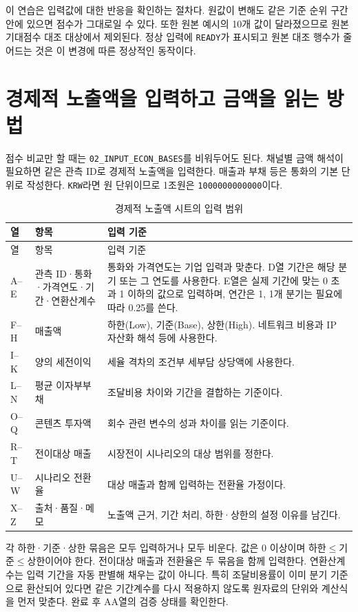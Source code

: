 이 연습은 입력값에 대한 반응을 확인하는 절차다. 원값이 변해도 같은 기준 순위 구간 안에 있으면 점수가 그대로일 수 있다. 또한 원본 예시의 10개 값이 달라졌으므로 원본 기대점수 대조 대상에서 제외된다. 정상 입력에 \texttt{READY}가 표시되고 원본 대조 행수가 줄어드는 것은 이 변경에 따른 정상적인 동작이다.

\section{경제적 노출액을 입력하고 금액을 읽는 방법}

점수 비교만 할 때는 \nolinkurl{02_INPUT_ECON_BASES}를 비워두어도 된다. 채널별 금액 해석이 필요하면 같은 관측 ID로 경제적 노출액을 입력한다. 매출과 부채 등은 통화의 기본 단위로 작성한다. \texttt{KRW}라면 원 단위이므로 1조원은 \texttt{1000000000000}이다.

\begin{longtable}{@{}L{2.3cm}L{4.0cm}L{8.4cm}@{}}
\caption{경제적 노출액 시트의 입력 범위}\label{tab:simulator-economic-input}\\
\toprule
{}
열 & 항목 & 입력 기준 \\
\midrule
\endfirsthead
\toprule
{}
열 & 항목 & 입력 기준 \\
\midrule
\endhead
\bottomrule
\endfoot
A--E & 관측 ID·통화·가격연도·기간·연환산계수 & 통화와 가격연도는 기업 입력과 맞춘다. D열 기간은 해당 분기 또는 그 연도를 사용한다. E열은 실제 기간에 맞는 0 초과 1 이하의 값으로 입력하며, 연간은 1, 1개 분기는 필요에 따라 0.25를 쓴다. \\
F--H & 매출액 & 하한(Low), 기준(Base), 상한(High). 네트워크 비용과 IP 자산화 해석 등에 사용한다. \\
I--K & 양의 세전이익 & 세율 격차의 조건부 세부담 상당액에 사용한다. \\
L--N & 평균 이자부부채 & 조달비용 차이와 기간을 결합하는 기준이다. \\
O--Q & 콘텐츠 투자액 & 회수 관련 변수의 성과 차이를 읽는 기준이다. \\
R--T & 전이대상 매출 & 시장전이 시나리오의 대상 범위를 정한다. \\
U--W & 시나리오 전환율 & 대상 매출과 함께 입력하는 전환율 가정이다. \\
X--Z & 출처·품질·메모 & 노출액 근거, 기간 처리, 하한·상한의 설정 이유를 남긴다. \\
\end{longtable}

각 하한·기준·상한 묶음은 모두 입력하거나 모두 비운다. 값은 0 이상이며 하한\(\leq\)기준\(\leq\)상한이어야 한다. 전이대상 매출과 전환율은 두 묶음을 함께 입력한다. 연환산계수는 입력 기간을 자동 판별해 채우는 값이 아니다. 특히 조달비용률이 이미 분기 기준으로 환산되어 있다면 같은 기간계수를 다시 적용하지 않도록 원자료의 단위와 계산식을 먼저 맞춘다. 완료 후 AA열의 검증 상태를 확인한다.

